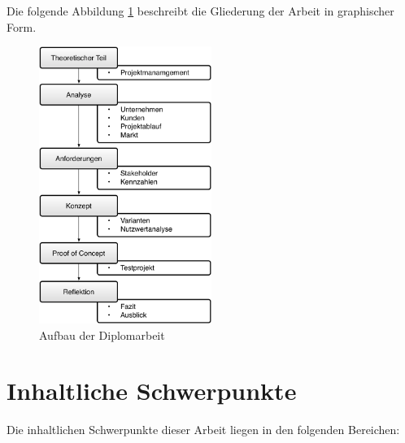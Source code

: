 Die folgende Abbildung \ref{pic:01_gliederung_arbeit} beschreibt die Gliederung der 
Arbeit in graphischer Form.

\begin{figure}[htbp]
\begin{center}
\includegraphics[width=0.5\textwidth,angle=0]{./bilder/einleitung/01_gliederung_arbeit.pdf}
\caption{Aufbau der Diplomarbeit}
\label{pic:01_gliederung_arbeit}
\end{center}
\end{figure}


\section{Inhaltliche Schwerpunkte}
Die inhaltlichen Schwerpunkte dieser Arbeit liegen in den folgenden Bereichen:

